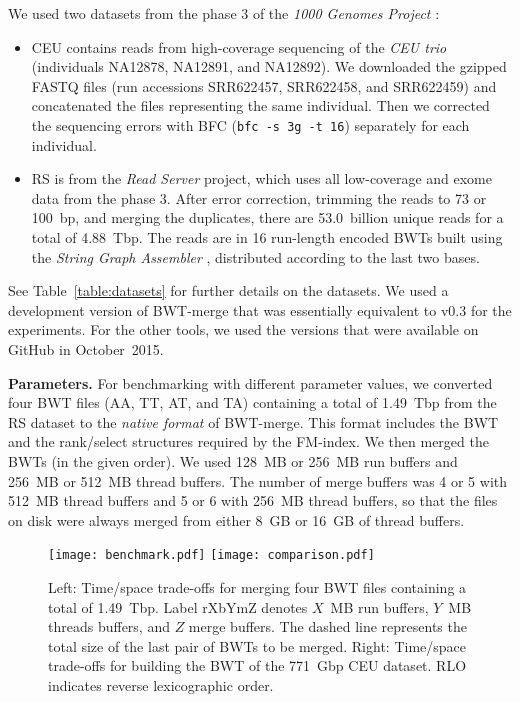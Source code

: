 \documentclass[smallabstract,smallcaptions]{dccpaper}
\newcommand{\BWT}{\textsf{BWT}}
\newcommand{\rank}{\textsf{rank}}
\newcommand{\select}{\textsf{select}}
\newcommand{\BWTmerge}{\textsf{BWT\nobreakdash-merge}}
\newcommand{\CEU}{\textsf{CEU}}
\newcommand{\RS}{\textsf{RS}}
\begin{document}
We used two datasets from the phase 3 of the \emph{1000 Genomes Project} \cite{1000GP2015}:
\begin{itemize}

\item \CEU{} contains reads from high-coverage sequencing of the \emph{CEU trio} (individuals NA12878, NA12891, and NA12892). We downloaded the gzipped FASTQ files (run accessions SRR622457, SRR622458, and SRR622459) and concatenated the files representing the same individual. Then we corrected the sequencing errors with BFC \cite{Li2015} (\texttt{bfc -s 3g -t 16}) separately for each individual.

\item \RS{} is from the \emph{Read Server} project, which uses all low-coverage and exome data from the phase 3. After error correction, trimming the reads to 73 or 100~bp, and merging the duplicates, there are 53.0~billion unique reads for a total of 4.88~Tbp. The reads are in 16 run-length encoded \BWT{}s built using the \emph{String Graph Assembler} \cite{Simpson2012}, distributed according to the last two bases.

\end{itemize}
See Table~\ref{table:datasets} for further details on the datasets. We used a development version of \BWTmerge{} that was essentially equivalent to v0.3 for the experiments. For the other tools, we used the versions that were available on GitHub in October~2015.

\smallbreak\noindent\textbf{Parameters.} For benchmarking with different parameter values, we converted four \BWT{} files (AA, TT, AT, and TA) containing a total of 1.49~Tbp from the \RS{} dataset to the \emph{native format} of \BWTmerge. This format includes the \BWT{} and the \rank/\select{} structures required by the FM-index. We then merged the \BWT{}s (in the given order). We used 128~MB or 256~MB run buffers and 256~MB or 512~MB thread buffers. The number of merge buffers was 4 or 5 with 512~MB thread buffers and 5 or 6 with 256~MB thread buffers, so that the files on disk were always merged from either 8~GB or 16~GB of thread buffers.

\begin{figure}[t!]
\begin{center}
\texttt{[image: benchmark.pdf]}%
\hspace{-0.3in}%
\texttt{[image: comparison.pdf]}
\end{center}
\caption{Left: Time/space trade-offs for merging four \BWT{} files containing a total of 1.49~Tbp. Label rXbYmZ denotes $X$~MB run buffers, $Y$~MB threads buffers, and $Z$ merge buffers. The dashed line represents the total size of the last pair of \BWT{}s to be merged. Right: Time/space trade-offs for building the \BWT{} of the 771~Gbp \CEU{} dataset. RLO indicates reverse lexicographic order.}\label{fig:benchmark}
\end{figure}
\end{document}
